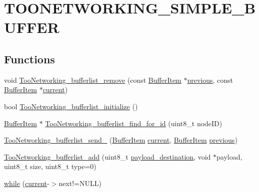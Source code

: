 \hypertarget{group__TOONETWORKING__SIMPLE__BUFFER}{}\section{T\+O\+O\+N\+E\+T\+W\+O\+R\+K\+I\+N\+G\+\_\+\+S\+I\+M\+P\+L\+E\+\_\+\+B\+U\+F\+F\+ER}
\label{group__TOONETWORKING__SIMPLE__BUFFER}
\subsection*{Functions}
\begin{DoxyCompactItemize}
\item 
void \hyperlink{group__TOONETWORKING__SIMPLE__BUFFER_gabc4c02ca4eefe0474368ecde5573f9e1}{Too\+Networking\+\_\+bufferlist\+\_\+remove} (const \hyperlink{structBufferItem}{Buffer\+Item} $\ast$\hyperlink{group__TOONETWORKING__SIMPLE__BUFFER_gaf1966d7084d2373905ae510e8f04a581}{previous}, const \hyperlink{structBufferItem}{Buffer\+Item} $\ast$\hyperlink{group__TOONETWORKING__SIMPLE__BUFFER_gae8b515cceb310a575b6c2677ba93ea7e}{current})
\item 
bool \hyperlink{group__TOONETWORKING__SIMPLE__BUFFER_gaa8a4e879d4d71fed2a8940cf93b75ae4}{Too\+Networking\+\_\+bufferlist\+\_\+initialize} ()
\item 
\hyperlink{structBufferItem}{Buffer\+Item} $\ast$ \hyperlink{group__TOONETWORKING__SIMPLE__BUFFER_ga0dd5e9de81eea99b99669a607c9b4028}{Too\+Networking\+\_\+bufferlist\+\_\+find\+\_\+for\+\_\+id} (uint8\+\_\+t node\+ID)
\item 
\hyperlink{group__TOONETWORKING__SIMPLE__BUFFER_gaf0c72173d810d3aa6d14e1414904f3d0}{Too\+Networking\+\_\+bufferlist\+\_\+send\+\_\+} (\hyperlink{structBufferItem}{Buffer\+Item} \hyperlink{group__TOONETWORKING__SIMPLE__BUFFER_gae8b515cceb310a575b6c2677ba93ea7e}{current}, \hyperlink{structBufferItem}{Buffer\+Item} \hyperlink{group__TOONETWORKING__SIMPLE__BUFFER_gaf1966d7084d2373905ae510e8f04a581}{previous})
\item 
\hyperlink{group__TOONETWORKING__SIMPLE__BUFFER_ga915fbb5e8e24dc6d0a23c246c7d8c0d2}{Too\+Networking\+\_\+bufferlist\+\_\+add} (uint8\+\_\+t \hyperlink{group__TOONETWORKING__SIMPLE__BUFFER_ga76db772dc25d4b2f5eb800e93ca3fd0b}{payload\+\_\+destination}, void $\ast$payload, uint8\+\_\+t size, uint8\+\_\+t type=0)
\item 
\hyperlink{group__TOONETWORKING__SIMPLE__BUFFER_gacc00c9f431dfb687a7177bdfc7ddf9b5}{while} (\hyperlink{group__TOONETWORKING__SIMPLE__BUFFER_gae8b515cceb310a575b6c2677ba93ea7e}{current}-\/$>$next!=N\+U\+LL)

\end{DoxyCompactItemize}
